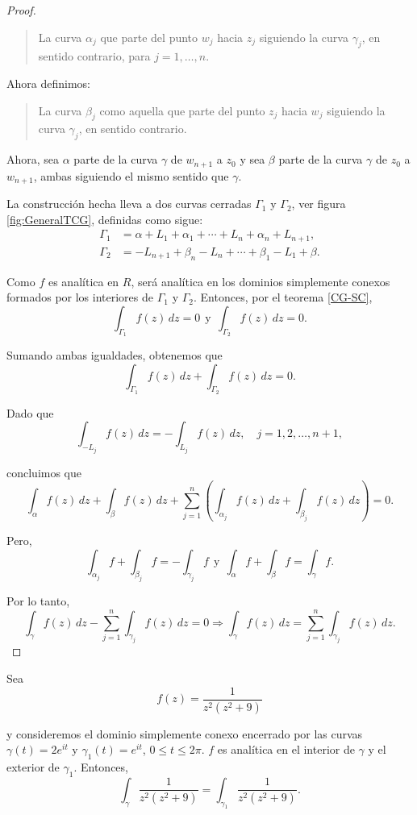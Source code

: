 \begin{proof}
\begin{quote}
    La curva $\alpha_j$ que parte del punto $w_j$ hacia $z_j$ siguiendo la curva $\gamma_j$, en sentido contrario, para $j = 1, \dots, n$.
\end{quote}

Ahora definimos:
    
\begin{quote}
  La curva $\beta_j$ como aquella que parte del punto $z_j$ hacia $w_j$ siguiendo la curva $\gamma_j$, en sentido contrario.   
\end{quote}

Ahora, sea $\alpha$ parte de la curva $\gamma$ de $w_{n+1}$ a $z_0$ y sea $\beta$ parte de la curva $\gamma$ de  $z_0$ a $w_{n+1}$, ambas siguiendo el mismo sentido que $\gamma$.

La construcción hecha lleva a dos curvas cerradas $\Gamma_1$ y $\Gamma_2$, ver figura \ref{fig:GeneralTCG}, definidas como sigue:
\begin{align*}
\Gamma_1 &= \alpha + L_1 + \alpha_1 + \cdots + L_{n} + \alpha_n + L_{n+1}, \\
\Gamma_2 &= -L_{n+1} + \beta_n - L_{n} + \cdots + \beta_1 - L_1 + \beta.
\end{align*}

Como $f$ es analítica en $R$, será analítica en los dominios simplemente conexos formados por los interiores de $\Gamma_1$ y $\Gamma_2$. Entonces, por el teorema \ref{CG-SC},
$$\int_{\Gamma_1} f(z) \,dz = 0 ~~\mbox{y}~~ \int_{\Gamma_2} f(z) \,dz = 0.$$

Sumando ambas igualdades, obtenemos que
$$\int_{\Gamma_1} f(z) \,dz  + \int_{\Gamma_2} f(z) \,dz = 0.$$

Dado que
$$\int_{-L_j} f(z) \,dz = - \int_{L_j} f(z)\,dz, \quad j = 1,2, \dots, n+1,$$

concluimos que
$$\int_{\alpha} f(z) \,dz + \int_{\beta} f(z) \,dz + \sum_{j=1}^n \left(\int_{\alpha_j} f(z) \,dz + \int_{\beta_j} f(z) \,dz\right) = 0.$$

Pero,
$$\int_{\alpha_j} f + \int_{\beta_j} f = - \int_{\gamma_j} f ~~\mbox{y}~~ \int_{\alpha} f + \int_{\beta} f = \int_{\gamma} f.$$

Por lo tanto,
$$\int_{\gamma}f(z) \,dz - \sum_{j=1}^n \int_{\gamma_j} f(z) \,dz = 0 \Rightarrow \int_{\gamma} f(z) \,dz= \sum_{j=1}^n \int_{\gamma_j} f(z) \,dz. $$

\end{proof}



\begin{ejemplo}
Sea 
$$f(z) = \frac{1}{z^2(z^2 + 9)}$$

y consideremos el dominio simplemente conexo encerrado por las curvas $\gamma(t) = 2e^{it}$ y $\gamma_1(t) = e^{it}$, $0 \leq t \leq 2\pi$. $f$ es analítica en el interior de $\gamma$ y el exterior de $\gamma_1$. Entonces,
$$\int_{\gamma} \frac{1}{z^2(z^2+9)} = \int_{\gamma_1}\frac{1}{z^2(z^2+9)}.$$
\end{ejemplo}

